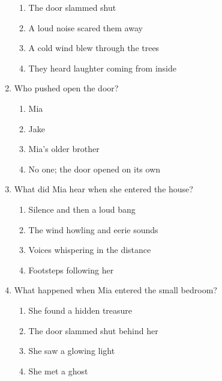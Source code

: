 \documentclass[12pt]{article}
\begin{document}
\begin{enumerate}
    \begin{enumerate}[label=\Alph*.]
        \item The door slammed shut
        \item A loud noise scared them away
        \item A cold wind blew through the trees
        \item They heard laughter coming from inside
    \end{enumerate}
    
    \vspace{0.5cm}

    \item Who pushed open the door?

    \begin{enumerate}[label=\Alph*.]
        \item Mia
        \item Jake
        \item Mia’s older brother
        \item No one; the door opened on its own
    \end{enumerate}
    
    \vspace{0.5cm}

    \item What did Mia hear when she entered the house?

    \begin{enumerate}[label=\Alph*.]
        \item Silence and then a loud bang
        \item The wind howling and eerie sounds
        \item Voices whispering in the distance
        \item Footsteps following her
    \end{enumerate}
    
    \vspace{0.5cm}

    \item What happened when Mia entered the small bedroom?

    \begin{enumerate}[label=\Alph*.]
        \item She found a hidden treasure
        \item The door slammed shut behind her
        \item She saw a glowing light
        \item She met a ghost
    \end{enumerate}
    

\end{enumerate}
\end{document}
